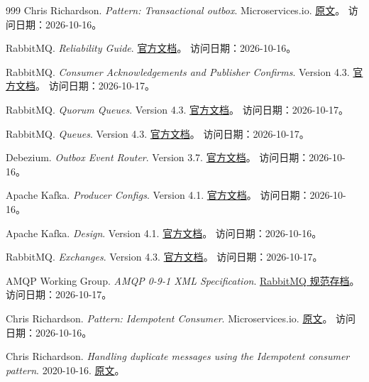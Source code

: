 \begin{thebibliography}{999}
Chris Richardson.
\textit{Pattern: Transactional outbox}.
Microservices.io.
\href{https://microservices.io/patterns/data/transactional-outbox.html}{原文}。
访问日期：2026-10-16。

RabbitMQ.
\textit{Reliability Guide}.
\href{https://www.rabbitmq.com/docs/reliability}{官方文档}。
访问日期：2026-10-16。

RabbitMQ.
\textit{Consumer Acknowledgements and Publisher Confirms}. Version 4.3.
\href{https://www.rabbitmq.com/docs/confirms}{官方文档}。
访问日期：2026-10-17。

RabbitMQ.
\textit{Quorum Queues}. Version 4.3.
\href{https://www.rabbitmq.com/docs/quorum-queues}{官方文档}。
访问日期：2026-10-17。

RabbitMQ.
\textit{Queues}. Version 4.3.
\href{https://www.rabbitmq.com/docs/queues}{官方文档}。
访问日期：2026-10-17。

Debezium.
\textit{Outbox Event Router}. Version 3.7.
\href{https://debezium.io/documentation/reference/stable/transformations/outbox-event-router.html}{官方文档}。
访问日期：2026-10-16。

Apache Kafka.
\textit{Producer Configs}. Version 4.1.
\href{https://kafka.apache.org/41/configuration/producer-configs/}{官方文档}。
访问日期：2026-10-16。

Apache Kafka.
\textit{Design}. Version 4.1.
\href{https://kafka.apache.org/41/design/design/}{官方文档}。
访问日期：2026-10-16。

RabbitMQ.
\textit{Exchanges}. Version 4.3.
\href{https://www.rabbitmq.com/docs/exchanges}{官方文档}。
访问日期：2026-10-17。

AMQP Working Group.
\textit{AMQP 0-9-1 XML Specification}.
\href{https://www.rabbitmq.com/resources/specs/amqp0-9-1.xml}{RabbitMQ 规范存档}。
访问日期：2026-10-17。

Chris Richardson.
\textit{Pattern: Idempotent Consumer}.
Microservices.io.
\href{https://microservices.io/patterns/communication-style/idempotent-consumer.html}{原文}。
访问日期：2026-10-16。

Chris Richardson.
\textit{Handling duplicate messages using the Idempotent consumer pattern}.
2020-10-16.
\href{https://microservices.io/post/microservices/patterns/2020/10/16/idempotent-consumer.html}{原文}。


\end{thebibliography}
